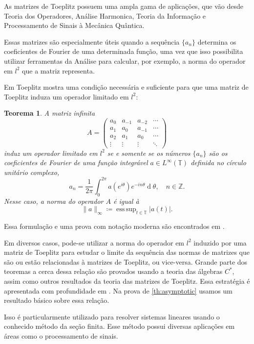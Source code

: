 \documentclass[a4paper,12pt]{article}
\renewcommand{\d}[1]{\ensuremath{\operatorname{d}\!{#1}}}
\DeclareMathOperator*{\esssup}{ess\,sup}
\newtheorem{theorem}{Teorema}
\theoremstyle{definition}
\begin{document}
As matrizes de Toeplitz possuem uma ampla gama de aplicações, que vão desde Teoria dos Operadores, Análise Harmonica, Teoria da Informação e Processamento de Sinais à Mecânica Quântica.

Essas matrizes são especialmente úteis quando a sequência $\{a_n\}$ determina os coeficientes de Fourier de uma determinada função, uma vez que isso possibilita utilizar ferramentas da Análise para calcular, por exemplo, a norma do operador em $l^2$ que a matriz representa.

Em \cite{Toeplitz1911} Toeplitz mostra uma condição necessária e suficiente para que uma matriz de Toeplitz induza um operador limitado em $l^2$:

\begin{theorem}
  A matriz infinita \[A = \begin{pmatrix} a_{0} & a_{-1} & a_{-2} & \cdots \\ a_{1} & a_{0} & a_{-1} & \cdots \\ a_2 & a_{1} & a_{0} & \cdots \\ \vdots & \vdots & \vdots & \ddots \end{pmatrix}\] induz um operador limitado em $l^2$ se e somente se os números $\{a_n\}$ são os coeficientes de Fourier de uma função integrável $a \in L^\infty(\mathbb{T})$ definida no círculo unitário complexo, \[a_n = \frac{1}{2\pi} \int_{0}^{2\pi} a(e^{i \theta})e^{-i n \theta} \d{\theta}, \quad n \in \mathbb{Z}\text{.}\]
  Nesse caso, a norma do operador $A$ é igual à \[\|a\|_{\infty} \coloneqq \esssup_{t \in \mathbb{T}}\lvert a(t)\rvert\text{.}\]
\end{theorem}

Essa formulação e uma prova com notação moderna são encontrados em \cite{bottcher}.

Em diversos casos, pode-se utilizar a norma do operador em $l^2$ induzido por uma matriz de Toeplitz para estudar o limite da sequência das normas de matrizes que são ou estão relacionadas à matrizes de Toeplitz, ou vice-versa. Grande parte dos teoremas a cerca dessa relação são provados usando a teoria das álgebras $C^\ast$, assim como outros resultados da teoria das matrizes de Toeplitz. Essa estratégia é apresentada com profundidade em \cite{bottcher}. Na prova de \ref{th:asymptotic} usamos um resultado básico sobre essa relação.

Isso é particularmente utilizado para resolver sistemas lineares usando o conhecido método da seção finita. Esse método possui diversas aplicações em áreas como o processamento de sinais.
\end{document}
